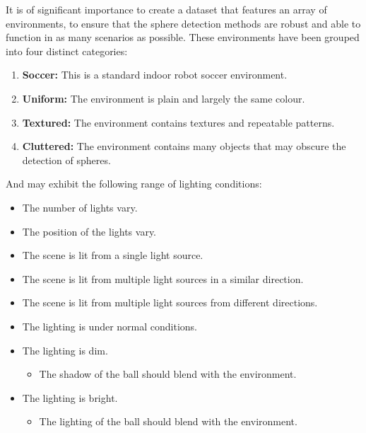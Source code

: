 \documentclass[11pt]{scrartcl}
\begin{document}
{{        	It is of significant importance to create a dataset that features an
        	array of environments, to ensure that the sphere detection methods are
        	robust and able to function in as many scenarios as possible. These
        	environments have been grouped into four distinct categories:

        	\begin{enumerate}
        		\item \textbf{Soccer:} This is a standard indoor robot soccer 
        		environment.
        		\item \textbf{Uniform:} The environment is plain and largely the same
        		colour.
        		\item \textbf{Textured:} The environment contains textures and
        		repeatable patterns.
        		\item \textbf{Cluttered:} The environment contains many objects that
        		may obscure the detection of spheres.
        	\end{enumerate}
        	
        	And may exhibit the following range of lighting conditions:

        	\begin{itemize}
        		\item The number of lights vary.
        		\item The position of the lights vary.
        		\item The scene is lit from a single light source.
        		\item The scene is lit from multiple light sources in a similar direction.
        		\item The scene is lit from multiple light sources from different directions.
        		\item The lighting is under normal conditions.
        		\item The lighting is dim.
        		\begin{itemize}
        			\item The shadow of the ball should blend with the environment.
        		\end{itemize}
        		\item The lighting is bright.
        		\begin{itemize}
        			\item The lighting of the ball should blend with the environment.
        		\end{itemize}
        	\end{itemize}

}}
\end{document}

